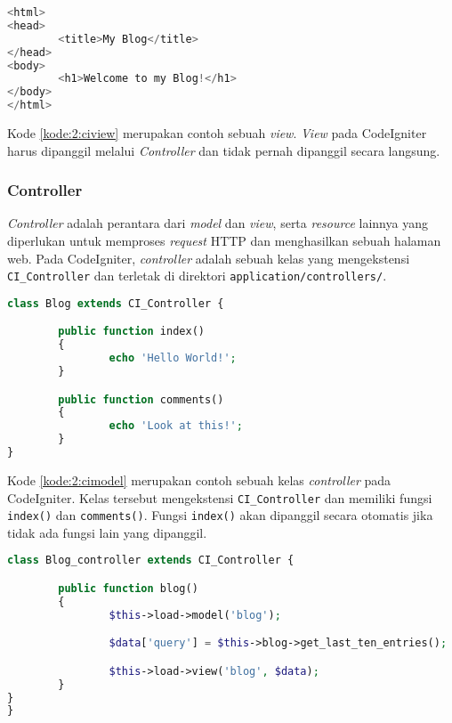 \begin{lstlisting}[language=php, caption=Contoh \textit{view}, label=kode:2:ciview]
<html>
<head>
        <title>My Blog</title>
</head>
<body>
        <h1>Welcome to my Blog!</h1>
</body>
</html>
\end{lstlisting}

Kode \ref{kode:2:ciview} merupakan contoh sebuah \textit{view}. \textit{View} pada CodeIgniter harus dipanggil melalui \textit{Controller} dan tidak pernah dipanggil secara langsung.
	
\subsubsection{Controller}
\textit{Controller} adalah perantara dari \textit{model} dan \textit{view}, serta \textit{resource} lainnya yang diperlukan untuk memproses \textit{request} HTTP dan menghasilkan sebuah halaman web. Pada CodeIgniter, \textit{controller} adalah sebuah kelas yang mengekstensi \verb|CI_Controller| dan terletak di direktori \verb|application/controllers/|.

\begin{lstlisting}[language=php, caption=Contoh \textit{controller}, label=kode:2:cicontroller]
class Blog extends CI_Controller {

        public function index()
        {
                echo 'Hello World!';
        }

        public function comments()
        {
                echo 'Look at this!';
        }
}
\end{lstlisting}

Kode \ref{kode:2:cimodel} merupakan contoh sebuah kelas \textit{controller} pada CodeIgniter. Kelas tersebut mengekstensi \verb|CI_Controller| dan memiliki fungsi \verb|index()| dan \verb|comments()|. Fungsi \verb|index()| akan dipanggil secara otomatis jika tidak ada fungsi lain yang dipanggil. 

\begin{lstlisting}[language=php, caption=Contoh memuat \textit{model} dan menampilkan \textit{view}, label=kode:2:cimodelview]
class Blog_controller extends CI_Controller {

        public function blog()
        {
                $this->load->model('blog');

                $data['query'] = $this->blog->get_last_ten_entries();

                $this->load->view('blog', $data);
        }
}
}
\end{lstlisting}

